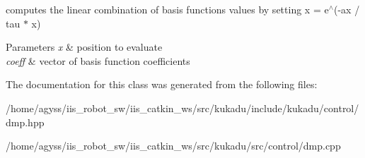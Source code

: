 computes the linear combination of basis functions values by setting x = e$^\wedge$(-\/ax / tau $\ast$ x) 


\begin{DoxyParams}{Parameters}
{\em x} & position to evaluate \\
\hline
{\em coeff} & vector of basis function coefficients \\
\hline
\end{DoxyParams}


The documentation for this class was generated from the following files\+:\begin{DoxyCompactItemize}
\item 
/home/agyss/iis\+\_\+robot\+\_\+sw/iis\+\_\+catkin\+\_\+ws/src/kukadu/include/kukadu/control/dmp.\+hpp\item 
/home/agyss/iis\+\_\+robot\+\_\+sw/iis\+\_\+catkin\+\_\+ws/src/kukadu/src/control/dmp.\+cpp\end{DoxyCompactItemize}
